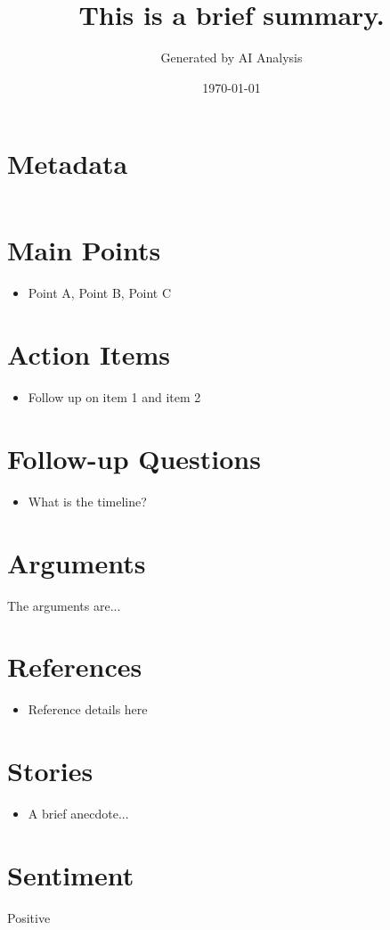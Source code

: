 \documentclass{article}
\begin{document}
\title{This is a brief summary.}
\author{Generated by AI Analysis}
\date{\today}
\maketitle

\section*{Metadata}
\begin{tabular}{ll}
\toprule
\bottomrule
\end{tabular}

\section{Main Points}
\begin{itemize}[leftmargin=*]
  \item Point A, Point B, Point C
\end{itemize}

\section{Action Items}
\begin{itemize}[leftmargin=*]
  \item Follow up on item 1 and item 2
\end{itemize}

\section{Follow-up Questions}
\begin{itemize}[leftmargin=*]
  \item What is the timeline?
\end{itemize}

\section{Arguments}
The arguments are...

\section{References}
\begin{itemize}[leftmargin=*]
  \item Reference details here
\end{itemize}

\section{Stories}
\begin{itemize}[leftmargin=*]
  \item A brief anecdote...
\end{itemize}

\section{Sentiment}
Positive
\end{document}
